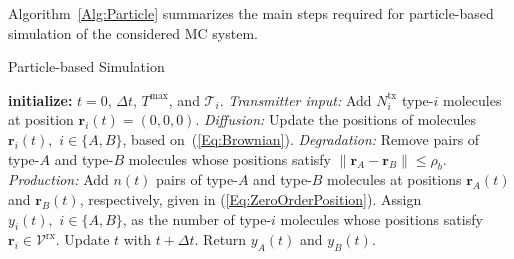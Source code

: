 \documentclass[conference]{IEEEtran}
\begin{document}
Algorithm~\ref{Alg:Particle} summarizes the main steps required for particle-based simulation of the considered MC system.

\begin{algorithm}[t]
\caption{Particle-based Simulation}
 \begin{algorithmic}[1]\label{Alg:Particle}
 \STATE \textbf{initialize:} $t=0$, $\Delta t$, $T^{\max}$, and $\mathcal{T}_i$.   
      \STATE \textit{Transmitter input:}  Add $N^{\mathrm{tx}}_i$ type-$i$ molecules at position $\mathbf{r}_i(t) = (0,0,0)$.
      \ENDIF
       \STATE \textit{Diffusion:} Update the positions of molecules $\mathbf{r}_i(t),\,\,i\in\{A,B\}$, based on~(\ref{Eq:Brownian}).
       \STATE \textit{Degradation:} Remove pairs of type-$A$ and type-$B$ molecules whose positions satisfy $\|\mathbf{r}_A-\mathbf{r}_B\|\leq\rho_b$.
       \STATE \textit{Production:} Add $n(t)$ pairs of type-$A$ and type-$B$ molecules at positions $\mathbf{r}_A(t)$ and $\mathbf{r}_B(t)$, respectively,  given in (\ref{Eq:ZeroOrderPosition}).
       \STATE Assign $y_i(t),\,\,i\in\{A,B\}$, as the number  of type-$i$ molecules whose positions satisfy $\mathbf{r}_i\in\mathcal{V}^{\mathrm{rx}}$.
              \STATE Update $t$ with  $t+\Delta t$.
      \ENDWHILE
      \STATE Return $y_A(t)$ and $y_B(t)$.
  \end{algorithmic}
\end{algorithm}

\section{}\label{App:Prop_MLDetector} %
\end{document}
